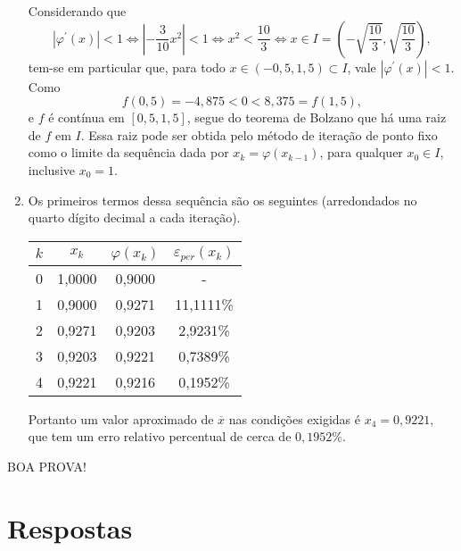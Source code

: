 \documentclass[12pt,a4paper]{article}
\begin{document}
\begin{ExerciseList}
\begin{enumerate}
Considerando que
\[
|\varphi^\prime(x)| < 1
\Leftrightarrow
\left|-\frac{3}{10}x^2\right| < 1
\Leftrightarrow
x^2 < \frac{10}{3}
\Leftrightarrow
x \in I = \left(-\sqrt{\frac{10}{3}}, \sqrt{\frac{10}{3}}\right),
\]
tem-se em particular que, para todo $x \in (-0,5, 1,5) \subset I$, vale $|\varphi^\prime(x)| < 1$. Como
\[
f(0,5) = -4,875 < 0 < 8,375 = f(1,5),
\]
e $f$ é contínua em $[0,5, 1,5]$, segue do teorema de Bolzano que há uma raiz de $f$ em $I$. Essa raiz pode ser obtida pelo método de iteração de ponto fixo como o limite da sequência dada por $x_k = \varphi(x_{k-1})$, para qualquer $x_0 \in I$, inclusive $x_0 = 1$.

\item Os primeiros termos dessa sequência são os seguintes (arredondados no quarto dígito decimal a cada iteração).

\begin{center}
\begin{tabular}{cccc}
\hline
$k$ & $x_k$ & $\varphi(x_k)$ & $\varepsilon_{per}(x_k)$\\
\hline
0 & 1,0000 & 0,9000 & - \\
1 & 0,9000 & 0,9271 & 11,1111\% \\
2 & 0,9271 & 0,9203 &  2,9231\% \\
3 & 0,9203 & 0,9221 &  0,7389\% \\
4 & 0,9221 & 0,9216 &  0,1952\% \\
\hline
\end{tabular}
\end{center}
Portanto um valor aproximado de $\overline{x}$ nas condições exigidas é $x_4 = 0,9221$, que tem um erro relativo percentual de cerca de $0,1952\%$.
\end{enumerate}

\end{ExerciseList}

\vfill
\begin{center}
BOA PROVA!
\end{center}

\newpage
\restoregeometry
\section*{Respostas}
\shipoutAnswer
\end{document}
